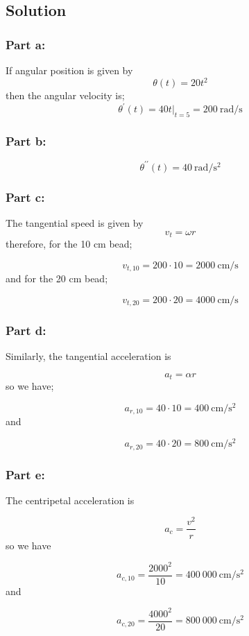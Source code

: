 \documentclass{article}
\begin{document}
\subsection*{Solution}
\subsubsection*{Part a:}
If angular position is given by
\begin{equation}
	\theta(t) = 20t^2
\end{equation}
then the angular velocity is;
\[
\theta^\prime(t) = 40t \big\rvert_{t=5} = \boxed{200\ \text{rad}/\text{s}}
\]

\subsubsection*{Part b:}
\[
	\theta^{\prime\prime}(t) = \boxed{40\ \text{rad}/\text{s}^2}
\]

\subsubsection*{Part c:}
The tangential speed is given by
\[
	v_t = \omega r
\]
therefore, for the 10 cm bead;

\[
	v_{t,10} = 200 \cdot 10 = \boxed{2000\ \text{cm}/\text{s}}
\]
and for the 20 cm bead;

\[
	v_{t,20} = 200 \cdot 20 = \boxed{4000\ \text{cm}/\text{s}}
\]

\subsubsection*{Part d:}
Similarly, the tangential acceleration is

\[
	a_t = \alpha r
\]
so we have;

\[
	a_{r,10} = 40 \cdot 10 = \boxed{400\ \text{cm}/\text{s}^2}
\]
and

\[
	a_{r,20} = 40 \cdot 20 = \boxed{800\ \text{cm}/\text{s}^2}
\]

\subsubsection*{Part e:}
The centripetal acceleration is

\[
	a_c = \frac{v^2}{r}
\]
so we have

\[
	a_{c,10} = \frac{2000^2}{10} = \boxed{400\ 000\ \text{cm}/\text{s}^2}
\]
and

\[
	a_{c,20} = \frac{4000^2}{20} = \boxed{800\ 000\ \text{cm}/\text{s}^2}
\]
\end{document}
